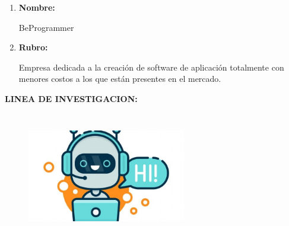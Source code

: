 \documentclass[12pt]{report}
\begin{document}
\begin{enumerate}
	\item \textbf{Nombre:}\par

{\fontsize{10pt}{12.0pt}\selectfont BeProgrammer\par}\par


\vspace{\baselineskip}
	\item \textbf{Rubro:}\par

{\fontsize{10pt}{12.0pt}\selectfont Empresa dedicada a la creación de software de aplicación totalmente con menores costos a los que están presentes en el mercado.\par}\par


\vspace{\baselineskip}

\end{enumerate}
	\item \textbf{LINEA DE INVESTIGACION:}\par




\begin{figure}[H]
\advance\leftskip -0.07in		\includegraphics[width=2.73in,height=2.21in]{./media/image2.jpeg}
\end{figure}






\newpage
\end{document}
